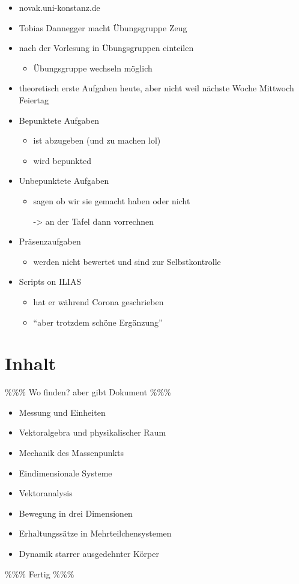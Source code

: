 \documentclass{gadsescript}
\begin{document}
\maketitle
\begin{itemize}
	\item novak.uni-konstanz.de
	\item Tobias Dannegger macht Übungsgruppe Zeug
	\item nach der Vorlesung in Übungsgruppen einteilen
		\begin{itemize}
			\item Übungsgruppe wechseln möglich
		\end{itemize}
	\item theoretisch erste Aufgaben heute, aber nicht weil nächste Woche Mittwoch Feiertag
	\item Bepunktete Aufgaben
		\begin{itemize}
			\item ist abzugeben (und zu machen lol)
			\item wird bepunkted
		\end{itemize}
	\item Unbepunktete Aufgaben
		\begin{itemize}
			\item sagen ob wir sie gemacht haben oder nicht
			\item[->] an der Tafel dann vorrechnen
		\end{itemize}
	\item Präsenzaufgaben
		\begin{itemize}
			\item werden nicht bewertet und sind zur Selbstkontrolle
		\end{itemize}
	\item Scripts on ILIAS
		\begin{itemize}
			\item hat er während Corona geschrieben
			\item ``aber trotzdem schöne Ergänzung''
		\end{itemize}
\end{itemize}

\section{Inhalt}
\%\%\% Wo finden? aber gibt Dokument \%\%\%
\begin{itemize}
	\item  Messung und Einheiten
	\item Vektoralgebra und physikalischer Raum
	\item Mechanik des Massenpunkts
	\item Eindimensionale Systeme
	\item Vektoranalysis
	\item Bewegung in drei Dimensionen
	\item Erhaltungssätze in Mehrteilchensystemen
	\item Dynamik starrer ausgedehnter Körper
\end{itemize}
\%\%\% Fertig \%\%\%
\end{document}
